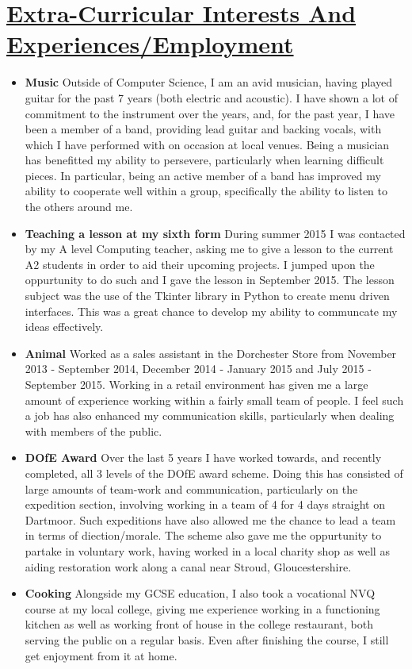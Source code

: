 \documentclass[11pt]{article}
\begin{document}
	\vspace{-20pt}
	\hspace{-100pt}\section*{\underline{Extra-Curricular Interests And Experiences/Employment}}
			\begin{itemize}
				\item \textbf{Music} Outside of Computer Science, I am an avid musician, having played guitar for the past 7 years (both electric and acoustic). I have shown a lot of commitment to the instrument over the years,  and, for the past year, I have been a member of a band, providing lead guitar and backing vocals, with which I have performed with on occasion at local venues. Being a musician has benefitted my ability to persevere, particularly when learning difficult pieces. In particular, being an active member of a band has improved my ability to cooperate well within a group, specifically the ability to listen to the others around me. 
				\item \textbf{Teaching a lesson at my sixth form} During summer 2015 I was contacted by my A level Computing teacher, asking me to give a lesson to the current A2 students in order to aid their upcoming projects. I jumped upon the oppurtunity to do such and I gave the lesson in September 2015. The lesson subject was the use of the Tkinter library in Python to create menu driven interfaces. This was a great chance to develop my ability to communcate my ideas effectively.
				\item \textbf{Animal} Worked as a sales assistant in the Dorchester Store from November 2013 - September 2014, December 2014 - January 2015 and July 2015 - September 2015. Working in a retail environment has given me a large amount of experience working within a fairly small team of people. I feel such a job has also enhanced my communication skills, particularly when dealing with members of the public. 
				\item \textbf{DOfE Award} Over the last 5 years I have worked towards, and recently completed, all 3 levels of the DOfE award scheme. Doing this has consisted of large amounts of team-work and communication, particularly on the expedition section, involving working in a team of 4 for 4 days straight on Dartmoor. Such expeditions have also allowed me the chance to lead a team in terms of diection/morale. The scheme also gave me the oppurtunity to partake in voluntary work, having worked in a local charity shop as well as aiding restoration work along a canal near Stroud, Gloucestershire.
				\item \textbf{Cooking} Alongside my GCSE education, I also took a vocational NVQ course at my local college, giving me experience working in a functioning kitchen as well as working front of house in the college restaurant, both serving the public on a regular basis. Even after finishing the course, I still get enjoyment from it at home.
			\end{itemize}
				
\end{document}
